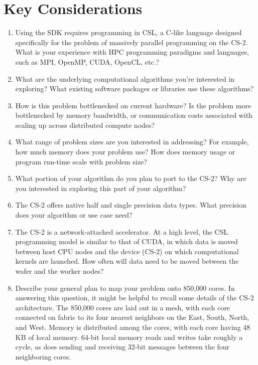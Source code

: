 \section{Key Considerations} \label{sec:key-Considerations}

\begin{enumerate}
    \item Using the SDK requires programming in CSL, a C-like language designed specifically for the problem of massively parallel programming on the CS-2.
    What is your experience with HPC programming paradigms and languages, such as MPI, OpenMP, CUDA, OpenCL, etc.?
    \item What are the underlying computational algorithms you're interested in exploring?
    What existing software packages or libraries use these algorithms?
    \item How is this problem bottlenecked on current hardware?
    Is the problem more bottlenecked by memory bandwidth, or communication costs associated with scaling up across distributed compute nodes?
    \item What range of problem sizes are you interested in addressing?
    For example, how much memory does your problem use?
    How does memory usage or program run-time scale with problem size?
    \item What portion of your algorithm do you plan to port to the CS-2?
    Why are you interested in exploring this part of your algorithm?
    \item The CS-2 offers native half and single precision data types.
    What precision does your algorithm or use case need?
    \item The CS-2 is a network-attached accelerator. At a high level, the CSL programming model is similar to that of CUDA, in which data is moved between host CPU nodes and the device (CS-2) on which computational kernels are launched.
    How often will data need to be moved between the wafer and the worker nodes?
    \item Describe your general plan to map your problem onto 850,000 cores. In answering this question, it might be helpful to recall some details of the CS-2 architecture.
    The 850,000 cores are laid out in a mesh, with each core connected on fabric to its four nearest neighbors on the East, South, North, and West.
    Memory is distributed among the cores, with each core having 48 KB of local memory.
    64-bit local memory reads and writes take roughly a cycle, as does sending and receiving 32-bit messages between the four neighboring cores.
\end{enumerate}
